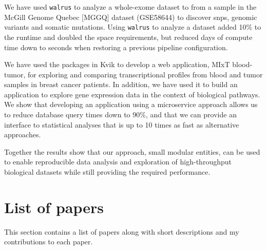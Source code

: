 We have used \texttt{walrus} to analyze a whole-exome dataset to from a sample
in the McGill Genome Quebec [MGGQ] dataset (GSE58644)\cite{tofigh2014prognostic}
to discover \glspl{snp}, genomic variants and somatic mutations. Using
\texttt{walrus} to analyze a dataset added 10\% to the runtime and doubled the
space requirements, but reduced days of compute time down to seconds when
restoring a previous pipeline configuration. 

We have used the packages in Kvik to develop a web application, MIxT
blood-tumor, for exploring and comparing transcriptional profiles from blood and
tumor samples in breast cancer patients.  In addition, we have used it to build
an application to explore gene expression data in the context of biological
pathways. We show that developing an application using a microservice approach
allows us to reduce database query times down to 90\%, and that we can provide
an interface to statistical analyses that is up to 10 times as fast as
alternative approaches. 

Together the results show that our approach, small modular entities, can be used
to enable reproducible data analysis and exploration of high-throughput
biological datasets while still providing the required performance. 

\section{List of papers} 

This section contains a list of papers along with short descriptions and my
contributions to each paper. 

